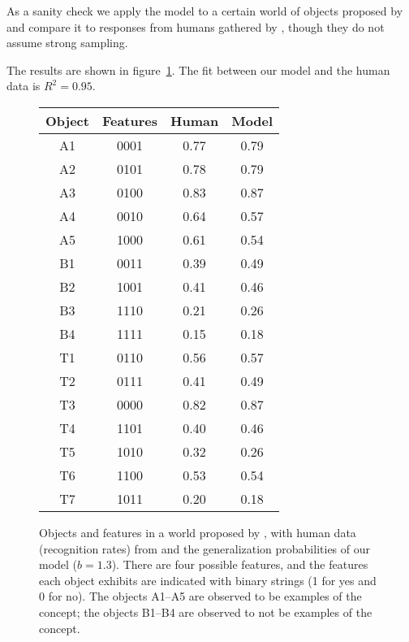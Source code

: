 \documentclass[jou,apacite]{apa6}
\begin{document}
As a sanity check we apply the model to a certain world of objects
proposed by \citet{medin}
and compare it to responses from humans 
gathered by \citet{nosofsky},
 though they
do not assume strong sampling.

The results are shown in figure~\ref{medindata}.
The fit between our model and the human data is $R^2 = 0.95$.


\begin{figure}
\centering
\begin{tabular*}{\columnwidth}{@{\extracolsep{\fill} } cccc}
	\toprule
	Object & Features & Human & Model \\ \midrule
	A1 & 0001 & 0.77 & 0.79 \\
	A2 & 0101 & 0.78 & 0.79 \\
	A3 & 0100 & 0.83 & 0.87 \\
	A4 & 0010 & 0.64 & 0.57 \\
	A5 & 1000 & 0.61 & 0.54 \\ \midrule
	B1 & 0011 & 0.39 & 0.49 \\
	B2 & 1001 & 0.41 & 0.46 \\
	B3 & 1110 & 0.21 & 0.26 \\
	B4 & 1111 & 0.15 & 0.18 \\ \midrule
	T1 & 0110 & 0.56 & 0.57 \\
	T2 & 0111 & 0.41 & 0.49 \\
	T3 & 0000 & 0.82 & 0.87 \\
	T4 & 1101 & 0.40 & 0.46 \\
	T5 & 1010 & 0.32 & 0.26 \\
	T6 & 1100 & 0.53 & 0.54 \\
	T7 & 1011 & 0.20 & 0.18 \\\bottomrule
\end{tabular*}
\bigskip\mbox{}
\caption{Objects and features in a world proposed by \citet{medin},
	with human data
	(recognition rates) from \citet{nosofsky} and the
	generalization probabilities of our model ($b=1.3$).
	There are four possible features, and the features each
	object exhibits are indicated with binary strings (1 for yes
	and 0 for no). The objects A1--A5 are observed to be
	examples of the concept; the objects B1--B4 are observed
	to not be examples of the concept.}
\label{medindata}
\end{figure}



\end{document}
